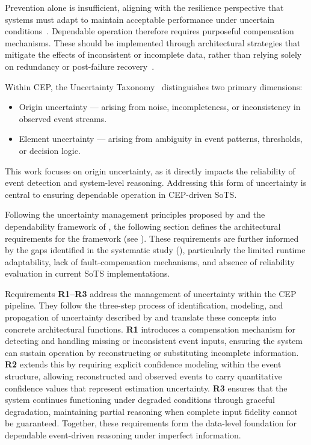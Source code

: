 Prevention alone is insufficient, aligning with the resilience perspective that systems must adapt to maintain acceptable performance under uncertain conditions~\cite{madni2020constructing, ed2018deterministic}. Dependable operation therefore requires purposeful compensation mechanisms. These should be implemented through architectural strategies that mitigate the effects of inconsistent or incomplete data, rather than relying solely on redundancy or post-failure recovery~\cite{bukowski2016system}.


Within CEP, the Uncertainty Taxonomy~\cite{wasserkrug2006taxonomy} distinguishes two primary dimensions:
\begin{itemize}[noitemsep, topsep=0pt]
    \item Origin uncertainty — arising from noise, incompleteness, or inconsistency in observed event streams.
    \item Element uncertainty — arising from ambiguity in event patterns, thresholds, or decision logic.
\end{itemize}
This work focuses on origin uncertainty, as it directly impacts the reliability of event detection and system-level reasoning. Addressing this form of uncertainty is central to ensuring dependable operation in CEP-driven SoTS.

Following the uncertainty management principles proposed by \citet{cugola2015complex} and the dependability framework of \citet{avizienis2004basic}, the following section defines the architectural requirements for the framework (see ). These requirements are further informed by the gaps identified in the systematic study (), particularly the limited runtime adaptability, lack of fault-compensation mechanisms, and absence of reliability evaluation in current SoTS implementations.



Requirements \textbf{R1--R3} address the management of uncertainty within the CEP pipeline.  
They follow the three-step process of identification, modeling, and propagation of uncertainty described by \citet{cugola2015complex} and translate these concepts into concrete architectural functions.  
\textbf{R1} introduces a compensation mechanism for detecting and handling missing or inconsistent event inputs, ensuring the system can sustain operation by reconstructing or substituting incomplete information.  
\textbf{R2} extends this by requiring explicit confidence modeling within the event structure, allowing reconstructed and observed events to carry quantitative confidence values that represent estimation uncertainty.  
\textbf{R3} ensures that the system continues functioning under degraded conditions through graceful degradation, maintaining partial reasoning when complete input fidelity cannot be guaranteed.  
Together, these requirements form the data-level foundation for dependable event-driven reasoning under imperfect information.


